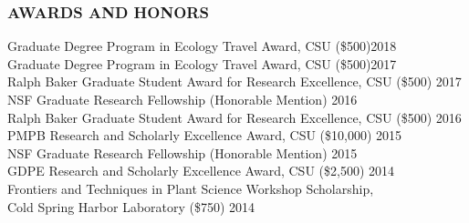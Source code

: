 \documentclass[12pt,english]{article}
\begin{document}
\subsubsection*{AWARDS AND HONORS}
\vspace{-0.5ex}
\hspace*{1.0em} Graduate Degree Program in Ecology Travel Award, CSU (\$500)\hfill2018
\vspace{1ex}\\
\hspace*{1.0em} Graduate Degree Program in Ecology Travel Award, CSU (\$500)\hfill2017
\vspace{1ex}\\
\hspace*{1.0em} Ralph Baker Graduate Student Award for Research Excellence, CSU (\$500)
\hfill
2017
\vspace{1ex}\\
\hspace*{1.0em} NSF Graduate Research Fellowship (Honorable Mention)
\hfill
2016
\vspace{1ex}\\
\hspace*{1.0em} Ralph Baker Graduate Student Award for Research Excellence, CSU (\$500)
\hfill
2016
\vspace{1ex}\\
\hspace*{1.0em} PMPB Research and Scholarly Excellence Award, CSU (\$10,000)
\hfill
2015
\vspace{1ex}\\
\hspace*{1.0em} NSF Graduate Research Fellowship (Honorable Mention)
\hfill
2015
\vspace{1ex}\\
\hspace*{1.0em} GDPE Research and Scholarly Excellence Award, CSU (\$2,500)
\hfill
2014
\vspace{1ex}\\
\hspace*{1.0em}  Frontiers and Techniques in Plant Science Workshop Scholarship,\\
\hspace*{1.0em} Cold Spring Harbor Laboratory   (\$750)
\hfill
2014
\vspace{1ex}


\end{document}
